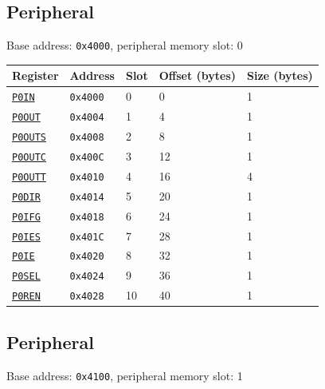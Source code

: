 \subsection{ Peripheral}
\noindent Base address: \texttt{0x4000}, peripheral memory slot: 0

\begin{tabularx}{\textwidth}{ l l l l X }
\textbf{Register} & \textbf{Address} & \textbf{Slot} & \textbf{Offset (bytes)} & \textbf{Size (bytes)} \\ \hline
\hyperref[ss:PxIN]{\texttt{P0IN}} & \texttt{0x4000} & 0 & 0 & 1 \\
\rowcolor{tablehighlightcolor} \hyperref[ss:PxOUT]{\texttt{P0OUT}} & \texttt{0x4004} & 1 & 4 & 1 \\
\hyperref[ss:PxOUTS]{\texttt{P0OUTS}} & \texttt{0x4008} & 2 & 8 & 1 \\
\rowcolor{tablehighlightcolor} \hyperref[ss:PxOUTC]{\texttt{P0OUTC}} & \texttt{0x400C} & 3 & 12 & 1 \\
\hyperref[ss:PxOUTT]{\texttt{P0OUTT}} & \texttt{0x4010} & 4 & 16 & 4 \\
\rowcolor{tablehighlightcolor} \hyperref[ss:PxDIR]{\texttt{P0DIR}} & \texttt{0x4014} & 5 & 20 & 1 \\
\hyperref[ss:PxIFG]{\texttt{P0IFG}} & \texttt{0x4018} & 6 & 24 & 1 \\
\rowcolor{tablehighlightcolor} \hyperref[ss:PxIES]{\texttt{P0IES}} & \texttt{0x401C} & 7 & 28 & 1 \\
\hyperref[ss:PxIE]{\texttt{P0IE}} & \texttt{0x4020} & 8 & 32 & 1 \\
\rowcolor{tablehighlightcolor} \hyperref[ss:PxSEL]{\texttt{P0SEL}} & \texttt{0x4024} & 9 & 36 & 1 \\
\hyperref[ss:PxREN]{\texttt{P0REN}} & \texttt{0x4028} & 10 & 40 & 1 \\
\hline
\end{tabularx}

\subsection{ Peripheral}
\noindent Base address: \texttt{0x4100}, peripheral memory slot: 1

